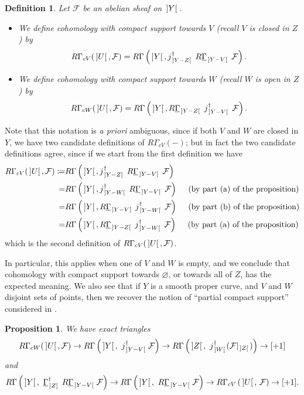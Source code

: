 \documentclass[cjm]{ipart}
\theoremstyle{plain}
\newtheorem{proposition}[theorem]{Proposition}
\newtheorem{definition}[theorem]{Definition}
\theoremstyle{remark}
\DeclarePairedDelimiter{\tb}{{\,]}}{{[\, }} %
\newcommand{\cF}{\mathcal{F}}
\newcommand{\uGa}{\underline{\Gamma}}
\numberwithin{equation}{subsection}
\begin{document}
  \begin{definition}
   \label{def:partialsupport}
   Let $\cF$ be an abelian sheaf on $\tb{Y}$.
   \begin{itemize}
    \item We define \emph{cohomology with compact support towards $V$} (recall $V$ is closed in $Z$) by
    \[ R\Gamma_{cV}(\tb{U}, \cF) =
    R\Gamma\left(\tb{Y},
    j^{\dagger}_{\tb{Y-Z}}\ R\uGa_{\tb{Y-V}}\ \cF\right).
    \]
    \item We define  \emph{cohomology with compact support towards $W$} (recall $W$ is open in $Z$) by
    \[ R\Gamma_{cW}(\tb{U}, \cF) =
    R\Gamma\left(\tb{Y},
    R\uGa_{\tb{Y-Z}}\
    j^\dagger_{\tb{Y-V}}\  \cF\right).
    \]
   \end{itemize}
  \end{definition}

  Note that this notation is \emph{a priori} ambiguous, since if both $V$ and $W$ are closed in $Y$, we have two candidate definitions of $R\Gamma_{cV}(-)$; but in fact the two candidate definitions agree, since if we start from the first definition we have
  \begin{align*}
  R\Gamma_{cV}(\tb{U}, \cF) \coloneqq&
  R\Gamma\left(\tb{Y},
  j^{\dagger}_{\tb{Y-Z}}\ R\uGa_{\tb{Y-V}}\ \cF\right) \\
  =& R\Gamma\left(\tb{Y}, j^{\dagger}_{\tb{Y-W}}\ R\uGa_{\tb{Y-V}}\ \cF\right) \quad\text{ (by part (a) of the proposition)}\\
  =& R\Gamma\left(\tb{Y}, R\uGa_{\tb{Y-V}}\ j^{\dagger}_{\tb{Y-W}}\ \cF\right) \quad\text{ (by part (b) of the proposition)} \\
  =& R\Gamma\left(\tb{Y}, R\uGa_{\tb{Y-Z}}\ j^{\dagger}_{\tb{Y-W}}\ \cF\right) \quad\text{ (by part (a) of the proposition)}
  \end{align*}
  which is the second definition of $R\Gamma_{cV}(\tb{U}, \cF)$.

  \begin{remark}
   In particular, this applies when one of $V$ and $W$ is empty, and we conclude that cohomology with compact support towards $\varnothing$, or towards all of $Z$, has the expected meaning. We also see that if $Y$ is a smooth proper curve, and $V$ and $W$ disjoint sets of points, then we recover the notion of ``partial compact support'' considered in \cite{LSZ-asai}.
  \end{remark}

  \begin{proposition}
   \label{prop:exactseqs}
   We have exact triangles
   \[ R\Gamma_{cW}(\tb{U}, \cF) \to R\Gamma\left(\tb{Y},\ j^\dagger_{\tb{Y-V}}\, \cF\right) \to R\Gamma\left(\tb{Z},\  j_{\tb{W}}^\dag(\cF|_{\tb{Z}})\right) \to [+1] \]
   and
   \[
    R\Gamma\left(\tb{Y},\ \uGa_{\tb{Z}}^\dag\  R\uGa_{\tb{Y-V}}\,\cF\right) \to
    R\Gamma\left(\tb{Y},\ R\uGa_{\tb{Y-V}}\,\cF\right) \to
    R\Gamma_{cV}\left(\tb{U},\, \cF\right) \to [+1].
   \]
  \end{proposition}
\end{document}
